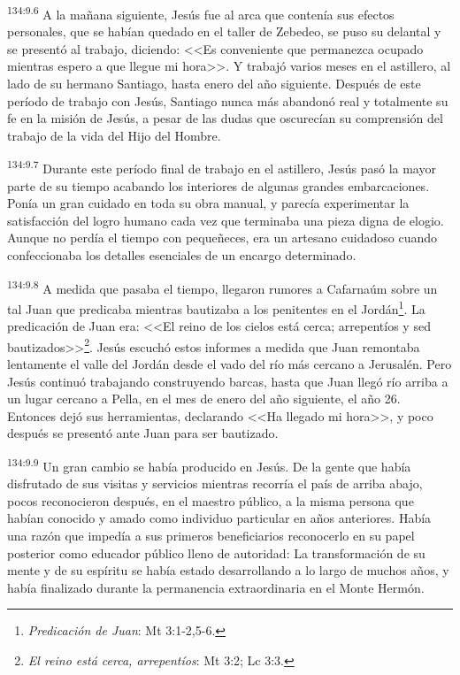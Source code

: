 \par 
\textsuperscript{134:9.6} A la mañana siguiente, Jesús fue al arca que contenía sus efectos personales, que se habían quedado en el taller de Zebedeo, se puso su delantal y se presentó al trabajo, diciendo: <<Es conveniente que permanezca ocupado mientras espero a que llegue mi hora>>. Y trabajó varios meses en el astillero, al lado de su hermano Santiago, hasta enero del año siguiente. Después de este período de trabajo con Jesús, Santiago nunca más abandonó real y totalmente su fe en la misión de Jesús, a pesar de las dudas que oscurecían su comprensión del trabajo de la vida del Hijo del Hombre.

\par 
\textsuperscript{134:9.7} Durante este período final de trabajo en el astillero, Jesús pasó la mayor parte de su tiempo acabando los interiores de algunas grandes embarcaciones. Ponía un gran cuidado en toda su obra manual, y parecía experimentar la satisfacción del logro humano cada vez que terminaba una pieza digna de elogio. Aunque no perdía el tiempo con pequeñeces, era un artesano cuidadoso cuando confeccionaba los detalles esenciales de un encargo determinado.

\par 
\textsuperscript{134:9.8} A medida que pasaba el tiempo, llegaron rumores a Cafarnaúm sobre un tal Juan que predicaba mientras bautizaba a los penitentes en el Jordán\footnote{\textit{Predicación de Juan}: Mt 3:1-2,5-6.}. La predicación de Juan era: <<El reino de los cielos está cerca; arrepentíos y sed bautizados>>\footnote{\textit{El reino está cerca, arrepentíos}: Mt 3:2; Lc 3:3.}. Jesús escuchó estos informes a medida que Juan remontaba lentamente el valle del Jordán desde el vado del río más cercano a Jerusalén. Pero Jesús continuó trabajando construyendo barcas, hasta que Juan llegó río arriba a un lugar cercano a Pella, en el mes de enero del año siguiente, el año 26. Entonces dejó sus herramientas, declarando <<Ha llegado mi hora>>, y poco después se presentó ante Juan para ser bautizado.

\par 
\textsuperscript{134:9.9} Un gran cambio se había producido en Jesús. De la gente que había disfrutado de sus visitas y servicios mientras recorría el país de arriba abajo, pocos reconocieron después, en el maestro público, a la misma persona que habían conocido y amado como individuo particular en años anteriores. Había una razón que impedía a sus primeros beneficiarios reconocerlo en su papel posterior como educador público lleno de autoridad: La transformación de su mente y de su espíritu se había estado desarrollando a lo largo de muchos años, y había finalizado durante la permanencia extraordinaria en el Monte Hermón.